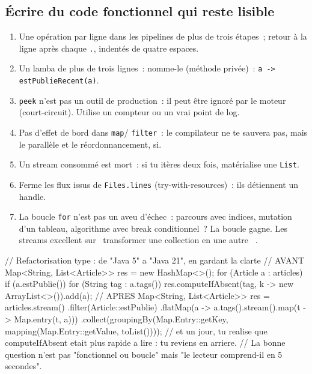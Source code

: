 \subsection{\'Ecrire du code fonctionnel qui reste lisible}

\begin{enumerate}
  \item Une op\'eration par ligne dans les pipelines de plus de trois \'etapes~; retour \`a la ligne
        apr\`es chaque \verb|.|, indent\'es de quatre espaces.
  \item Un lamba de plus de trois lignes~: nomme-le (m\'ethode priv\'ee)~: \verb|a -> estPublieRecent(a)|.
  \item \verb|peek| n'est pas un outil de production~: il peut \^etre ignor\'e par le moteur
        (court-circuit). Utilise un compteur ou un vrai point de log.
  \item Pas d'effet de bord dans \verb|map|/ \verb|filter|~: le compilateur ne te sauvera pas,
        mais le parall\`ele et le r\'eordonnancement, si.
  \item Un stream consomm\'e est mort~: si tu it\`eres deux fois, mat\'erialise une \verb|List|.
  \item Ferme les flux issus de \verb|Files.lines| (try-with-resources)~: ils d\'etiennent un handle.
  \item La boucle \verb|for| n'est pas un aveu d'\'echec~: parcours avec indices, mutation d'un
        tableau, algorithme avec break conditionnel~? La boucle gagne. Les streams excellent sur
        \og ~transformer une collection en une autre~ \fg{}.
\end{enumerate}

\begin{codejava}
// Refactorisation type : de "Java 5" a "Java 21", en gardant la clarte
// AVANT
Map<String, List<Article>> res = new HashMap<>();
for (Article a : articles) {
    if (a.estPublie()) {
        for (String tag : a.tags()) {
            res.computeIfAbsent(tag, k -> new ArrayList<>()).add(a);
        }
    }
}
// APRES
Map<String, List<Article>> res = articles.stream()
        .filter(Article::estPublie)
        .flatMap(a -> a.tags().stream().map(t -> Map.entry(t, a)))
        .collect(groupingBy(Map.Entry::getKey, mapping(Map.Entry::getValue, toList())));
// et un jour, tu realise que computeIfAbsent etait plus rapide a lire : tu reviens en arriere.
// La bonne question n'est pas "fonctionnel ou boucle" mais "le lecteur comprend-il en 5 secondes".
\end{codejava}

